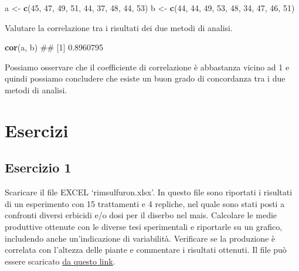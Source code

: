 \documentclass[a4paper,12pt,oneside]{book}
\newenvironment{Shaded}{\begin{snugshade}}{\end{snugshade}}
\newcommand{\KeywordTok}[1]{\textcolor[rgb]{0.13,0.29,0.53}{\textbf{#1}}}
\newcommand{\DecValTok}[1]{\textcolor[rgb]{0.00,0.00,0.81}{#1}}
\newcommand{\StringTok}[1]{\textcolor[rgb]{0.31,0.60,0.02}{#1}}
\newcommand{\NormalTok}[1]{#1}
\theoremstyle{definition}
\theoremstyle{definition}
\theoremstyle{definition}
\theoremstyle{remark}
\begin{document}
\begin{Shaded}
\begin{Highlighting}[]
\NormalTok{a <-}\StringTok{ }\KeywordTok{c}\NormalTok{(}\DecValTok{45}\NormalTok{, }\DecValTok{47}\NormalTok{, }\DecValTok{49}\NormalTok{, }\DecValTok{51}\NormalTok{, }\DecValTok{44}\NormalTok{, }\DecValTok{37}\NormalTok{, }\DecValTok{48}\NormalTok{, }\DecValTok{44}\NormalTok{, }\DecValTok{53}\NormalTok{)}
\NormalTok{b <-}\StringTok{ }\KeywordTok{c}\NormalTok{(}\DecValTok{44}\NormalTok{, }\DecValTok{44}\NormalTok{, }\DecValTok{49}\NormalTok{, }\DecValTok{53}\NormalTok{, }\DecValTok{48}\NormalTok{, }\DecValTok{34}\NormalTok{, }\DecValTok{47}\NormalTok{, }\DecValTok{46}\NormalTok{, }\DecValTok{51}\NormalTok{)}
\end{Highlighting}
\end{Shaded}

Valutare la correlazione tra i risultati dei due metodi di analisi.

\begin{Shaded}
\begin{Highlighting}[]
\KeywordTok{cor}\NormalTok{(a, b)}
\NormalTok{## [1] 0.8960795}
\end{Highlighting}
\end{Shaded}

Possiamo osservare che il coefficiente di correlazione è abbastanza
vicino ad 1 e quindi possiamo concludere che esiste un buon grado di
concordanza tra i due metodi di analisi.

\section*{Esercizi}\label{esercizi-2}

\subsection*{Esercizio 1}\label{esercizio-1-1}

Scaricare il file EXCEL `rimsulfuron.xlsx'. In questo file sono
riportati i risultati di un esperimento con 15 trattamenti e 4 repliche,
nel quale sono stati posti a confronti diversi erbicidi e/o dosi per il
diserbo nel mais. Calcolare le medie produttive ottenute con le diverse
tesi sperimentali e riportarle su un grafico, includendo anche
un'indicazione di variabilità. Verificare se la produzione è correlata
con l'altezza delle piante e commentare i risultati ottenuti. Il file
può essere scaricato
\href{https://www.casaonofri.it/_datasets/rimsulfuron.xlsx}{da questo
link}.
\end{document}
